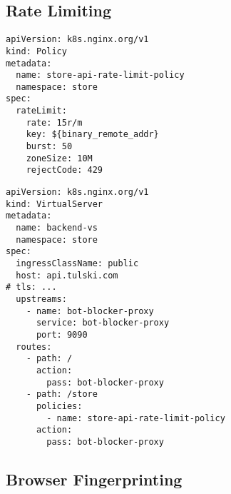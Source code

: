 \subsection{Rate Limiting}

\begin{figure*}[p]
    \begin{listing}[H]
        \begin{verbatim}
apiVersion: k8s.nginx.org/v1
kind: Policy
metadata:
  name: store-api-rate-limit-policy
  namespace: store
spec:
  rateLimit:
    rate: 15r/m
    key: ${binary_remote_addr}
    burst: 50
    zoneSize: 10M
    rejectCode: 429
        \end{verbatim}
        \caption{}
        \label{lst:rate-limiting-policy}
    \end{listing}

    \begin{listing}[H]
        \begin{verbatim}
apiVersion: k8s.nginx.org/v1
kind: VirtualServer
metadata:
  name: backend-vs
  namespace: store
spec:
  ingressClassName: public
  host: api.tulski.com
# tls: ...
  upstreams:
    - name: bot-blocker-proxy
      service: bot-blocker-proxy
      port: 9090
  routes:
    - path: /
      action:
        pass: bot-blocker-proxy
    - path: /store
      policies:
        - name: store-api-rate-limit-policy
      action:
        pass: bot-blocker-proxy
        \end{verbatim}
        \caption{}
        \label{lst:rate-limiting-virtual-server}
    \end{listing}
\end{figure*}


\subsection{Browser Fingerprinting}

